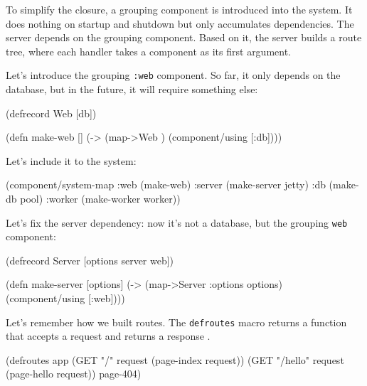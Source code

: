 To simplify the closure, a grouping component is introduced into the system. It does nothing on startup and shutdown but only accumulates dependencies. The server depends on the grouping component. Based on it, the server builds a route tree, where each handler takes a component as its first argument.

Let's introduce the grouping \verb|:web| component. So far, it only depends on the database, but in the future, it will require something else:

\begin{english}
  \begin{clojure}
(defrecord Web [db])

(defn make-web []
  (-> (map->Web {})
      (component/using [:db])))
  \end{clojure}
\end{english}

\noindent
Let's include it to the system:

\begin{english}
  \begin{clojure}
(component/system-map
 :web    (make-web)
 :server (make-server jetty)
 :db     (make-db pool)
 :worker (make-worker worker))
  \end{clojure}
\end{english}


Let's fix the server dependency: now it's not a database, but the grouping \verb|web| component:

\begin{english}
  \begin{clojure}
(defrecord Server
  [options server web])

(defn make-server [options]
  (-> (map->Server {:options options})
      (component/using [:web])))
  \end{clojure}
\end{english}


Let's remember how we built routes. The \verb|defroutes| macro returns a function that accepts a request and returns a response .

\ifnarrow

\begin{english}
  \begin{clojure}
(defroutes app
  (GET "/"
    request (page-index request))
  (GET "/hello"
    request (page-hello request))
  page-404)
  \end{clojure}
\end{english}

